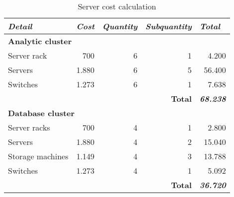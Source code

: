 \begin{table}[H]
\centering
\caption{Server cost calculation}
\label{table:server-cost}
\begin{tabular}{lrrrr}
\hline
\textit{Detail}  & \multicolumn{1}{l}{\textit{Cost}} & \multicolumn{1}{l}{\textit{Quantity}} & \multicolumn{1}{l}{\textit{Subquantity}} & \multicolumn{1}{l}{\textit{Total}} \\ \hline
\multicolumn{5}{l}{\textbf{Analytic cluster}}                                                                                                                                \\ \hline
Server rack      & 700                               & 6                                     & 1                                        & 4.200                              \\
Servers          & 1.880                             & 6                                     & 5                                        & 56.400                             \\
Switches         & 1.273                             & 6                                     & 1                                        & 7.638                              \\ \hline
\multicolumn{4}{r}{\textbf{Total}}                                                                                                      & \textit{\textbf{68.238}}           \\ \hline
\multicolumn{5}{l}{\textbf{Database cluster}}                                                                                                                                \\ \hline
Server racks     & 700                               & 4                                     & 1                                        & 2.800                              \\
Servers          & 1.880                             & 4                                     & 2                                        & 15.040                             \\
Storage machines & 1.149                             & 4                                     & 3                                        & 13.788                             \\
Switches         & 1.273                             & 4                                     & 1                                        & 5.092                              \\ \hline
\multicolumn{4}{r}{\textbf{Total}}                                                                                                      & \textit{\textbf{36.720}}          
\end{tabular}
\end{table}

